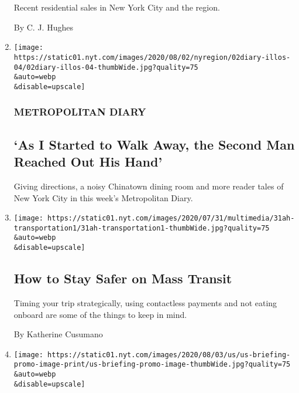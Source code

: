 \begin{enumerate}
  Recent residential sales in New York City and the region.

  By C. J. Hughes
\item
  \href{/2020/08/02/nyregion/metropolitan-diary.html}{}

  \texttt{[image: https://static01.nyt.com/images/2020/08/02/nyregion/02diary-illos-04/02diary-illos-04-thumbWide.jpg?quality=75\\\&auto=webp\\\&disable=upscale]}

  \hypertarget{metropolitan-diary}{%
  \subsubsection{METROPOLITAN DIARY}\label{metropolitan-diary}}

  \hypertarget{as-i-started-to-walk-away-the-second-man-reached-out-his-hand}{%
  \subsection{`As I Started to Walk Away, the Second Man Reached Out His
  Hand'}\label{as-i-started-to-walk-away-the-second-man-reached-out-his-hand}}

  Giving directions, a noisy Chinatown dining room and more reader tales
  of New York City in this week's Metropolitan Diary.
\item
  \href{/2020/08/01/at-home/coronavirus-public-transportation-subway.html}{}

  \texttt{[image: https://static01.nyt.com/images/2020/07/31/multimedia/31ah-transportation1/31ah-transportation1-thumbWide.jpg?quality=75\\\&auto=webp\\\&disable=upscale]}

  \hypertarget{how-to-stay-safer-on-mass-transit}{%
  \subsection{How to Stay Safer on Mass
  Transit}\label{how-to-stay-safer-on-mass-transit}}

  Timing your trip strategically, using contactless payments and not
  eating onboard are some of the things to keep in mind.

  By Katherine Cusumano
\item
  \href{/2020/08/01/world/coronavirus-covid-19.html}{}

  \texttt{[image: https://static01.nyt.com/images/2020/08/03/us/us-briefing-promo-image-print/us-briefing-promo-image-thumbWide.jpg?quality=75\\\&auto=webp\\\&disable=upscale]}

  \hypertarget{infections-swamp-the-us-which-recorded-42-of-all-its-coronavirus-cases-in-july}{%
}
\end{enumerate}

